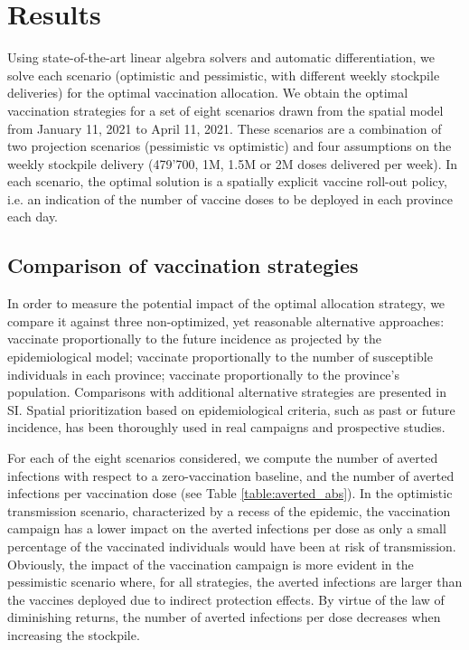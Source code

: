 \section{Results}
Using state-of-the-art linear algebra solvers and automatic differentiation, we solve each scenario (optimistic and pessimistic, with different weekly stockpile deliveries) for the optimal vaccination allocation. We obtain the optimal vaccination strategies for a set of eight scenarios drawn from the spatial model from January 11, 2021 to April 11, 2021. These scenarios are a combination of two projection scenarios (pessimistic vs optimistic) and four assumptions on the weekly stockpile delivery (479'700, 1M, 1.5M or 2M doses delivered per week). In each scenario, the optimal solution is a spatially explicit vaccine roll-out policy, i.e. an indication of the number of vaccine doses to be deployed in each province each day. %
\subsection*{Comparison of vaccination strategies}
In order to measure the potential impact of the optimal allocation strategy, we compare it against three non-optimized, yet reasonable alternative approaches: vaccinate proportionally to the future incidence as projected by the epidemiological model; vaccinate proportionally to the number of susceptible individuals in each province; vaccinate proportionally to the province's population. 
Comparisons with additional alternative strategies are presented in SI. Spatial prioritization based on epidemiological criteria, such as past\cite{Lee:AchievingCoordinatedNational:2020} or future\cite{Pasetto:RealtimeForecastingCholera:2018} incidence, has been thoroughly used in real campaigns and prospective studies.

For each of the eight scenarios considered, we compute the number of averted infections with respect to a zero-vaccination baseline, and the number of averted infections per vaccination dose (see Table \ref{table:averted_abs}). In the optimistic transmission scenario, characterized by a recess of the epidemic, the vaccination campaign has a lower impact on the averted infections per dose as only a small percentage of the vaccinated individuals would have been at risk of transmission. Obviously, the impact of the vaccination campaign is more evident in the pessimistic scenario where, for all strategies, the averted infections are larger than the vaccines deployed due to indirect protection effects. By virtue of the law of diminishing returns, the number of averted infections per dose decreases when increasing the stockpile. 

